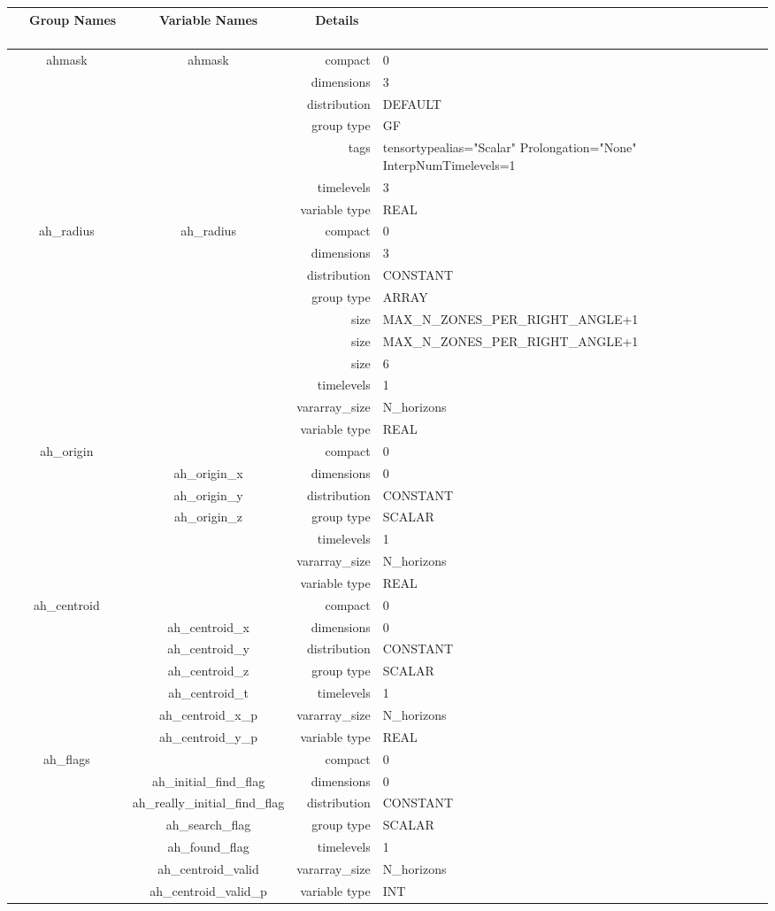 \begin{tabular*}{150mm}{|c|c@{\extracolsep{\fill}}|rl|} \hline 
~ {\bf Group Names} ~ & ~ {\bf Variable Names} ~  &{\bf Details} ~ & ~\\ 
\hline 
ahmask & ahmask & compact & 0 \\ 
 &  & dimensions & 3 \\ 
 &  & distribution & DEFAULT \\ 
 &  & group type & GF \\ 
 &  & tags & tensortypealias="Scalar" Prolongation="None" InterpNumTimelevels=1 \\ 
 &  & timelevels & 3 \\ 
 &  & variable type & REAL \\ 
\hline 
ah\_radius & ah\_radius & compact & 0 \\ 
 &  & dimensions & 3 \\ 
 &  & distribution & CONSTANT \\ 
 &  & group type & ARRAY \\ 
 &  & size & MAX\_N\_ZONES\_PER\_RIGHT\_ANGLE+1 \\ 
& ~ & size & MAX\_N\_ZONES\_PER\_RIGHT\_ANGLE+1 \\ 
 &  & size & 6 \\ 
 &  & timelevels & 1 \\ 
 &  & vararray\_size & N\_horizons \\ 
 &  & variable type & REAL \\ 
\hline 
ah\_origin &  & compact & 0 \\ 
 & ah\_origin\_x & dimensions & 0 \\ 
 & ah\_origin\_y & distribution & CONSTANT \\ 
 & ah\_origin\_z & group type & SCALAR \\ 
 &  & timelevels & 1 \\ 
 &  & vararray\_size & N\_horizons \\ 
 &  & variable type & REAL \\ 
\hline 
ah\_centroid &  & compact & 0 \\ 
 & ah\_centroid\_x & dimensions & 0 \\ 
 & ah\_centroid\_y & distribution & CONSTANT \\ 
 & ah\_centroid\_z & group type & SCALAR \\ 
 & ah\_centroid\_t & timelevels & 1 \\ 
 & ah\_centroid\_x\_p & vararray\_size & N\_horizons \\ 
 & ah\_centroid\_y\_p & variable type & REAL \\ 
\hline 
ah\_flags &  & compact & 0 \\ 
 & ah\_initial\_find\_flag & dimensions & 0 \\ 
 & ah\_really\_initial\_find\_flag & distribution & CONSTANT \\ 
 & ah\_search\_flag & group type & SCALAR \\ 
 & ah\_found\_flag & timelevels & 1 \\ 
 & ah\_centroid\_valid & vararray\_size & N\_horizons \\ 
 & ah\_centroid\_valid\_p & variable type & INT \\ 
\hline 
\end{tabular*} 
